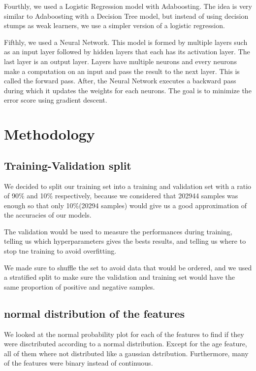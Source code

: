 \documentclass{article} %
\begin{document}
Fourthly, we used a Logistic Regression model with Adaboosting. The idea is very similar to Adaboosting with a Decision Tree model, but instead of 
using decision stumps as weak learners, we use a simpler version of a logistic regression.

Fifthly, we used a Neural Network. This model is formed by multiple layers such as an input layer followed by hidden layers that each has its activation 
layer. The last layer is an output layer. Layers have multiple neurons and every neurons make a computation on an input and pass the result to the next 
layer. This is called the forward pass. After, the Neural Network executes a backward pass during which it updates the weights for each neurons. The 
goal is to minimize the error score using gradient descent. 


\section{Methodology}
\label{headings}


\subsection{Training-Validation split}

We decided to split our training set into a training and validation set with a ratio of 90\% and 10\% respectively,
because we considered that 202944 samples was enough so that only 10\%(20294 samples) would give us a good approximation of the
accuracies of our models.

The validation would be used to measure the performances during training,
telling us which hyperparameters gives the bests results, and telling us where
to stop tne training to avoid overfitting.

We made sure to shuffle the set to avoid data that would be ordered, and we used a stratified split to make sure
the validation and training set would have the same proportion of positive and negative samples.

\subsection{normal distribution of the features}
We looked at the normal probability plot for each of the features to find if they were disctributed
according to a normal distribution. Except for the age feature, all of them where not distributed
like a gaussian dstribution. Furthermore, many of the features were binary instead of continuous.
\end{document}

